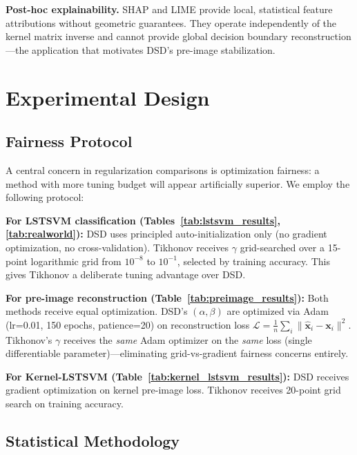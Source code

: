 \documentclass[preprint,review,12pt]{elsarticle}
\begin{document}
\textbf{Post-hoc explainability.} SHAP \cite{lundberg2017unified} and LIME \cite{ribeiro2016why} provide local, statistical feature attributions without geometric guarantees. They operate independently of the kernel matrix inverse and cannot provide global decision boundary reconstruction---the application that motivates DSD's pre-image stabilization.


\section{Experimental Design}
\label{sec:experiments}

\subsection{Fairness Protocol}

A central concern in regularization comparisons is optimization fairness: a method with more tuning budget will appear artificially superior. We employ the following protocol:

\textbf{For LSTSVM classification (Tables~\ref{tab:lstsvm_results}, \ref{tab:realworld}):} DSD uses principled auto-initialization only (no gradient optimization, no cross-validation). Tikhonov receives $\gamma$ grid-searched over a 15-point logarithmic grid from $10^{-8}$ to $10^{-1}$, selected by training accuracy. This gives Tikhonov a deliberate tuning advantage over DSD.

\textbf{For pre-image reconstruction (Table~\ref{tab:preimage_results}):} Both methods receive equal optimization. DSD's $(\alpha, \beta)$ are optimized via Adam (lr=0.01, 150 epochs, patience=20) on reconstruction loss $\mathcal{L} = \frac{1}{n}\sum_i \|\hat{\bm{x}}_i - \bm{x}_i\|^2$. Tikhonov's $\gamma$ receives the \emph{same} Adam optimizer on the \emph{same} loss (single differentiable parameter)---eliminating grid-vs-gradient fairness concerns entirely.

\textbf{For Kernel-LSTSVM (Table~\ref{tab:kernel_lstsvm_results}):} DSD receives gradient optimization on kernel pre-image loss. Tikhonov receives 20-point grid search on training accuracy.

\subsection{Statistical Methodology}
\end{document}
